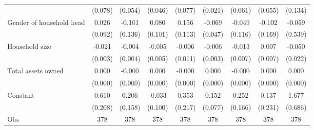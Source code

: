 {\begin{tabular}{l*{8}{c}}
                    &(0.078)         &(0.054)         &(0.046)         &(0.077)         &(0.021)         &(0.061)         &(0.055)         &(0.134)         \\
Gender of household head&0.026         &-0.101         &0.080         &0.156         &-0.069         &-0.049         &-0.102         &-0.059         \\
                    &(0.092)         &(0.136)         &(0.101)         &(0.113)         &(0.047)         &(0.116)         &(0.169)         &(0.539)         \\
Household size      &-0.021\sym{***}&-0.004         &-0.005         &-0.006         &-0.006\sym{*}  &-0.013         &0.007         &-0.050\sym{*}  \\
                    &(0.003)         &(0.004)         &(0.005)         &(0.011)         &(0.003)         &(0.007)         &(0.007)         &(0.022)         \\
Total assets owned  &0.000         &-0.000         &0.000         &-0.000         &0.000         &-0.000         &0.000         &0.000         \\
                    &(0.000)         &(0.000)         &(0.000)         &(0.000)         &(0.000)         &(0.000)         &(0.000)         &(0.000)         \\
Constant            &0.610\sym{**} &0.206         &-0.033         &0.353         &0.152\sym{*}  &0.252         &0.137         &1.677\sym{**} \\
                    &(0.208)         &(0.158)         &(0.100)         &(0.217)         &(0.077)         &(0.166)         &(0.231)         &(0.686)         \\
\hline
Obs                 &  378         &  378         &  378         &  378         &  378         &  378         &  378         &  378         \\
\hline\hline
\end{tabular}
}
